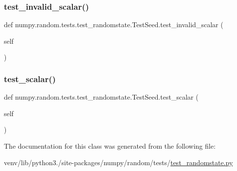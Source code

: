 \subsubsection{\texorpdfstring{test\+\_\+invalid\+\_\+scalar()}{test\_invalid\_scalar()}}
{\footnotesize\ttfamily def numpy.\+random.\+tests.\+test\+\_\+randomstate.\+Test\+Seed.\+test\+\_\+invalid\+\_\+scalar (\begin{DoxyParamCaption}\item[{}]{self }\end{DoxyParamCaption})}

\mbox{\label{classnumpy_1_1random_1_1tests_1_1test__randomstate_1_1TestSeed_a54ca45f008ccfc2dd13289b0ff8b54f6}} 
\subsubsection{\texorpdfstring{test\+\_\+scalar()}{test\_scalar()}}
{\footnotesize\ttfamily def numpy.\+random.\+tests.\+test\+\_\+randomstate.\+Test\+Seed.\+test\+\_\+scalar (\begin{DoxyParamCaption}\item[{}]{self }\end{DoxyParamCaption})}



The documentation for this class was generated from the following file\+:\begin{DoxyCompactItemize}
\item 
venv/lib/python3./site-\/packages/numpy/random/tests/\hyperlink{test__randomstate_8py}{test\+\_\+randomstate.\+py}\end{DoxyCompactItemize}

